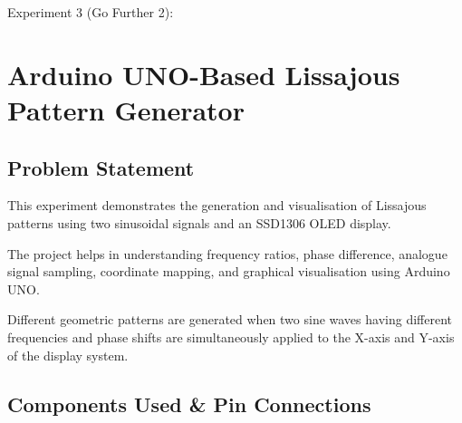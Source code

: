 
\clearpage
Experiment 3 (Go Further 2):
\section{Arduino UNO-Based Lissajous Pattern Generator}


\subsection{Problem Statement}

This experiment demonstrates the generation and visualisation of Lissajous patterns using two sinusoidal signals and an SSD1306 OLED display.

The project helps in understanding frequency ratios, phase difference, analogue signal sampling, coordinate mapping, and graphical visualisation using Arduino UNO.

Different geometric patterns are generated when two sine waves having different frequencies and phase shifts are simultaneously applied to the X-axis and Y-axis of the display system.


\subsection{Components Used \& Pin Connections}


